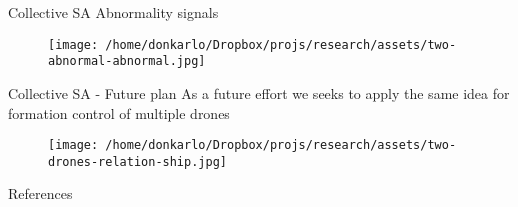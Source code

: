 \documentclass[unknownkeysallowed]{beamer}
\begin{document}
\begin{frame}{Collective SA}
	Abnormality signals
	\begin{figure}
		\texttt{[image: /home/donkarlo/Dropbox/projs/research/assets/two-abnormal-abnormal.jpg]}
		\caption{}
	\end{figure}
\end{frame}

\begin{frame}{Collective SA - Future plan}
	As a future effort we seeks to apply the same idea for formation control of multiple drones
	\begin{figure}
		\texttt{[image: /home/donkarlo/Dropbox/projs/research/assets/two-drones-relation-ship.jpg]}
		\caption{}
	\end{figure}
\end{frame}

\begin{frame}[allowframebreaks]{References}
	\printbibliography
\end{frame}
\end{document}
